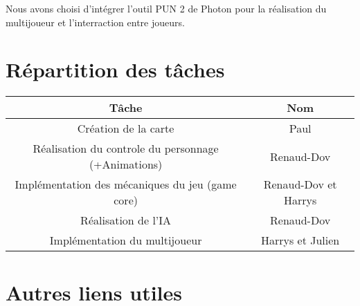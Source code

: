 \documentclass[french, 12pt, a4paper,twoside]{article}
\begin{document}
Nous avons choisi d'intégrer l'outil PUN 2 de Photon pour la réalisation du multijoueur et l'interraction entre joueurs.


\section{Répartition des tâches}
\begin{center}
    \begin{tabular}{|c||c|}
        \hline
        \textbf{Tâche} & \textbf{Nom} \tabularnewline
        \hline
        Création de la carte & Paul\tabularnewline
        \hline
        Réalisation du controle du personnage (+Animations) & Renaud-Dov\tabularnewline
        \hline
        Implémentation des mécaniques du jeu (game core) & Renaud-Dov et Harrys\tabularnewline
        \hline
        Réalisation de l'IA & Renaud-Dov \tabularnewline
        \hline
        Implémentation du multijoueur & Harrys et Julien \tabularnewline
        \hline
    \end{tabular}
\end{center}

% 


% 
\section{Autres liens utiles}
\end{document}
